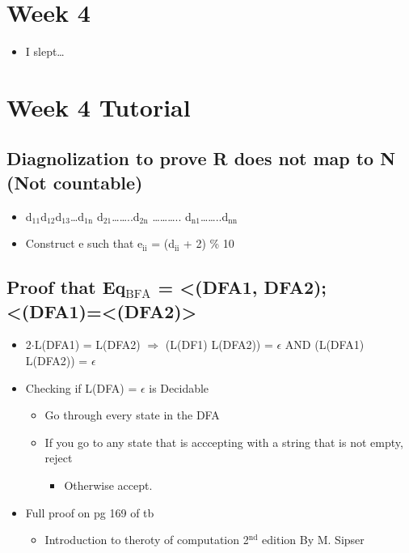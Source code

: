 \documentclass[11pt]{article}
\begin{document}
\section{Week 4}
\label{sec:org0f336ce}
\begin{itemize}
\item I slept\ldots{}
\end{itemize}
\section{Week 4 Tutorial}
\label{sec:org6d8553d}
\subsection{Diagnolization to prove R does not map to N (Not countable)}
\label{sec:org039f46b}
\begin{itemize}
\item d\(_{\text{11}}\)d\(_{\text{12}}\)d\(_{\text{13}}\)\ldots{}d\(_{\text{1n}}\)
d\(_{\text{21}}\)\ldots{}\ldots{}..d\(_{\text{2n}}\)
\ldots{}\ldots{}\ldots{}..
d\(_{\text{n1}}\)\ldots{}\ldots{}..d\(_{\text{nn}}\)
\item Construct e such that e\(_{\text{ii}}\) = (d\(_{\text{ii}}\) + 2) \% 10
\end{itemize}
\subsection{Proof that Eq\(_{\text{BFA}}\) = <(DFA1, DFA2); <(DFA1)=<(DFA2)>}
\label{sec:orgcd3bd49}
\begin{itemize}
\item 2\(\cdot\)L(DFA1) = L(DFA2) \(\Rightarrow\) (L(DF1) \intersect L(DFA2)) = \(\epsilon\)
AND (L(DFA1) \intersect L(DFA2)) = \(\epsilon\)
\item Checking if L(DFA) = \(\epsilon\) is Decidable
\begin{itemize}
\item Go through every state in the DFA
\item If you go to any state that is acccepting with a string that is not empty, reject
\begin{itemize}
\item Otherwise accept.
\end{itemize}
\end{itemize}
\item Full proof on pg 169 of tb
\begin{itemize}
\item Introduction to theroty of computation 2\(^{\text{nd}}\) edition By M. Sipser
\end{itemize}
\end{itemize}
\end{document}
